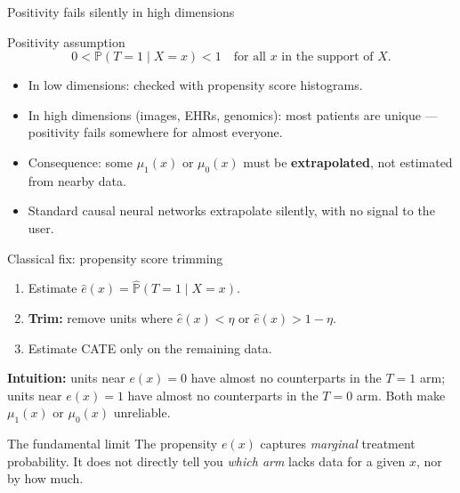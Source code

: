 \documentclass[aspectratio=169]{beamer}
\newcommand{\Prob}{\mathbb{P}}
\begin{document}
\begin{frame}{Positivity fails silently in high dimensions}

\begin{block}{Positivity assumption}
\[
0 < \Prob(T=1 \mid X=x) < 1
\quad \text{for all } x \text{ in the support of } X.
\]
\end{block}

\bigskip
\begin{itemize}
  \item In low dimensions: checked with propensity score histograms.
  \item In high dimensions (images, EHRs, genomics): most patients are
        unique --- positivity fails somewhere for almost everyone.
  \item Consequence: some $\mu_1(x)$ or $\mu_0(x)$ must be
        \textbf{extrapolated}, not estimated from nearby data.
  \item \alert{Standard causal neural networks extrapolate silently,
        with no signal to the user.}
\end{itemize}
\end{frame}

\begin{frame}{Classical fix: propensity score trimming}

\begin{enumerate}
  \item Estimate $\hat{e}(x) = \hat{\Prob}(T=1 \mid X=x)$.
  \item \textbf{Trim:} remove units where $\hat{e}(x) < \eta$ or
        $\hat{e}(x) > 1-\eta$.
  \item Estimate CATE only on the remaining data.
\end{enumerate}

\bigskip
\textbf{Intuition:} units near $e(x)=0$ have almost no counterparts in the
$T=1$ arm; units near $e(x)=1$ have almost no counterparts in the $T=0$ arm.
Both make $\mu_1(x)$ or $\mu_0(x)$ unreliable.

\bigskip
\begin{block}{The fundamental limit}
The propensity $e(x)$ captures \emph{marginal} treatment probability.
It does not directly tell you \emph{which arm} lacks data for a given $x$,
nor by how much.
\end{block}
\end{frame}
\end{document}
